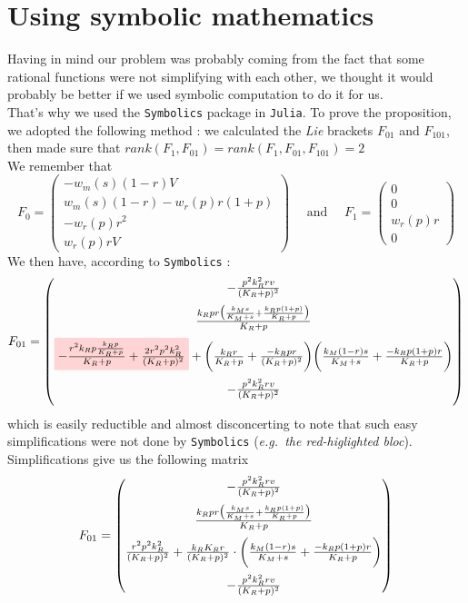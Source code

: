 \documentclass{tudelft-report}
\newcommand{\highlight}[2]{\colorbox{#1!17}{$\displaystyle #2$}}
\renewcommand{\highlight}[2]{\colorbox{#1!17}{#2}}
\begin{document}
\section*{Using symbolic mathematics}\noindent
Having in mind our problem was probably coming from the fact that some rational functions were not simplifying with each other, we thought it would probably be better if we used symbolic computation to do it for us.\\
That's why we used the \verb|Symbolics| package in \verb|Julia|. To prove the proposition, we adopted the following method : we calculated the \textit{Lie} brackets $F_{01}$ and $F_{101}$, then made sure that $rank(F_1, F_{01}) = rank(F_1, F_{01}, F_{101}) = 2$\\
We remember that 
$$F_0 = 
\begin{pmatrix}
 -w_m(s)(1-r)V \\
 w_m(s)(1-r)-w_r(p)r(1+p)\\
 -w_r(p) r^2\\
 w_r(p)rV
\end{pmatrix} \quad \textrm{ and } \quad F_1=
\begin{pmatrix}
 0\\ 
 0\\
 w_r(p)r\\
 0
\end{pmatrix}
$$
We then have, according to \verb|Symbolics| : $$F_{01} = 
\begin{pmatrix}
 \vspace{0.2cm}
 -\frac{p^2k_R^2rv}{(K_R + p)^2}\\
  \vspace{0.2cm}
 \frac{k_Rpr\big(\frac{k_Ms}{K_M+s}+\frac{k_Rp(1+p)}{K_R+p}\big)}{K_R+p} \\
  \vspace{0.2cm}
 \highlight{red}{$-\frac{r^2k_Rp\frac{k_Rp}{K_R+p}}{K_R+p} + \frac{2r^2p^2k_R^2}{(K_R+p)^2}$}+\bigg(\frac{k_Rr}{K_R+p} + \frac{-k_Rpr}{(K_R+p)^2}\bigg)\bigg(\frac{k_M(1-r)s}{K_M+s}+\frac{-k_Rp(1+p)r}{K_R+p} \bigg)\\
  \vspace{0.2cm}
 -\frac{p^2k_R^2rv}{(K_R+p)^2}
\end{pmatrix}
$$
which is easily reductible and almost disconcerting to note that such easy simplifications were not done by \verb|Symbolics| (\emph{e.g.\ the \highlight{red}{red-higlighted} bloc}).\\
Simplifications give us the following matrix $$F_{01} = 
\begin{pmatrix}
 \vspace{0.2cm}
 -\frac{p^2k_R^2rv}{(K_R + p)^2}\\
  \vspace{0.2cm}
 \frac{k_Rpr\big(\frac{k_Ms}{K_M+s}+\frac{k_Rp(1+p)}{K_R+p}\big)}{K_R+p} \\
 \vspace{0.2cm}
 \frac{r^2p^2k_R^2}{(K_R+p)^2} + \frac{k_RK_Rr}{(K_R+p)^2}\cdot \bigg(\frac{k_M(1-r)s}{K_M+s}+\frac{-k_Rp(1+p)r}{K_R+p} \bigg)\\
 -\frac{p^2k_R^2rv}{(K_R+p)^2}
\end{pmatrix}
$$
\end{document}
